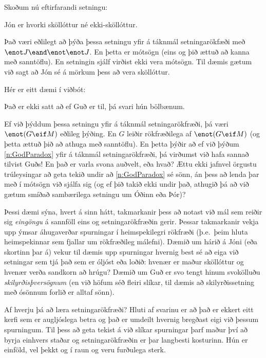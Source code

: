Skoðum nú eftirfarandi setningu:
	\begin{earg}
\setcounter{eargnum}{1}
		\item\label{n:JanBald} Jón er hvorki sköllóttur né ekki-sköllóttur.
	\end{earg}
Það væri eðlilegt að þýða þessa setningu yfir á táknmál setningarökfæði með $\enot J \eand \enot \enot J$. En þetta er mótsögn (eins og þið ættuð að kanna með sanntöflu). En setningin sjálf virðist ekki vera mótsögn. Til dæmis gætum við sagt að Jón sé á mörkum þess að vera sköllóttur.

Hér er eitt dæmi í viðbót:
	\begin{earg}
\setcounter{eargnum}{2}	
		\item\label{n:GodParadox} Það er ekki satt að ef Guð er til, þá svari hún bölbænum.	
	\end{earg}
Ef við þýddum þessa setningu yfir á táknmál setningarökfræði, þá væri $\enot (G \eif M)$ eðlileg þýðing. En $G$ leiðir rökfræðilega af $\enot (G \eif M)$ (og þetta ættuð þið að athuga með sanntöflu). En þetta þýðir að ef við þýðum \ref{n:GodParadox} yfir á táknmál setningarökfræði, þá virðumst við hafa sannað tilvist Guðs! En það er varla svona auðvelt, eða hvað? Ættu ekki jafnvel örgustu trúleysingar að geta tekið undir að \ref{n:GodParadox} sé sönn, án þess að lenda þar með í mótsögn við sjálfa sig (og ef þið takið ekki undir það, athugið þá að við gætum smíðað sambærilega setningu um Óðinn eða Þór)?

Þessi dæmi sýna, hvert á sinn hátt, takmarkanir þess að notast við mál sem reiðir sig \emph{eingöngu} á sannföll eins og setningarökfræðin gerir. Þessar takmarkanir vekja upp ýmsar áhugaverðar spurningar í heimspekilegri rökfræði (þ.e.\ þeim hluta heimspekinnar sem fjallar um rökfræðileg málefni). Dæmið um hárið á Jóni (eða skortinn þar á) vekur til dæmis upp spurningar hvernig best sé að eiga við setningar sem tjá það sem er óljóst eða loðið: hvenær er maður sköllóttur og hvenær verða sandkorn að hrúgu? Dæmið um Guð er svo tengt hinum svokölluðu \emph{skilyrðisþversögnum} (en við höfum séð fleiri slíkar, til dæmis að skilyrðissetning með ósönnum forlið er alltaf sönn). 

Af hverju þá að læra setningarökfræði? Hluti af svarinu er að það er ekkert eitt kerfi sem er augljóslega betra og það er umdeilt hvernig bregðast eigi við þessum spurningum. Til þess að geta tekist á við slíkar spurningar þarf maður því að byrja einhvers staðar og setningarökfræðin er þar langbesti kosturinn. Hún er einföld, vel þekkt og í raun og veru furðulega sterk.

